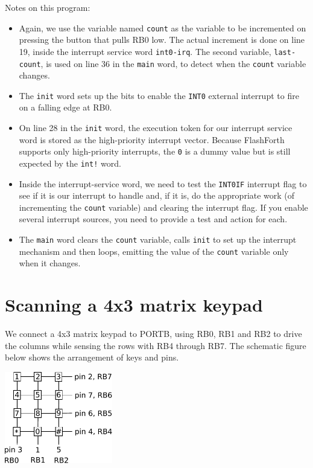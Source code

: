 \documentclass[12pt,a4paper]{article}
\begin{document}
\noindent
Notes on this program:
\begin{itemize}
  \item Again, we use the variable named \verb!count! as the variable to be incremented
   on pressing the button that pulls RB0 low.
   The actual increment is done on line 19, inside the interrupt service word \verb!int0-irq!.
   The second variable, \verb!last-count!, is used on line 36 in the \verb!main! word,
   to detect when the \verb!count! variable changes.
  \item The \verb!init! word sets up the bits to enable the \verb!INT0! external interrupt
   to fire on a falling edge at RB0.
  \item On line 28 in the \verb!init! word, the execution token for our interrupt service word
   is stored as the high-priority interrupt vector.
   Because FlashForth supports only high-priority interrupts, the \verb!0! is a dummy value 
   but is still expected by the \verb?int!? word.
  \item Inside the interrupt-service word, we need to test the \verb!INT0IF! interrupt flag
   to see if it is our interrupt to handle and, if it is, do the appropriate work 
   (of incrementing the \verb!count! variable) and clearing the interrupt flag.
   If you enable several interrupt sources, you need to provide a test and action for each.
  \item The \verb!main! word clears the \verb!count! variable, calls \verb!init! to set up the interrupt
   mechanism and then loops, emitting the value of the \verb!count! variable only when it changes.
\end{itemize}


\newpage
\section{Scanning a 4x3 matrix keypad}
\label{4x3-keypad-section}
%
We connect a 4x3 matrix keypad to PORTB, using RB0, RB1 and RB2 to drive the columns 
while sensing the rows with RB4 through RB7.
The schematic figure below shows the arrangement of keys and pins.

\medskip
\centerline{
\includegraphics[height=4cm]{../figs/keypad-4x3-portb.pdf}
}
\end{document}
